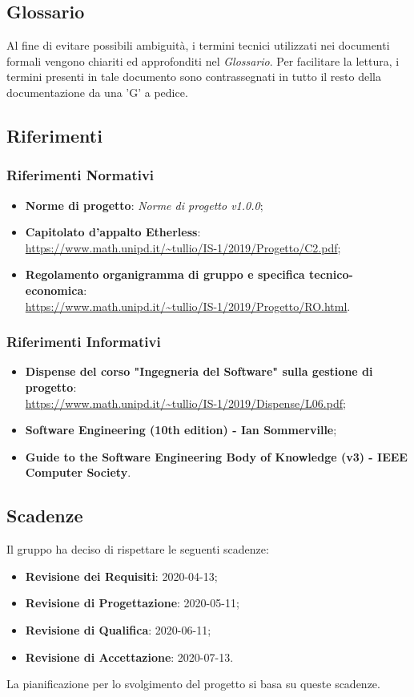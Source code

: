 \subsection{Glossario}
Al fine di evitare possibili ambiguità, i termini tecnici utilizzati nei documenti formali vengono chiariti ed approfonditi nel \textit{Glossario}. Per facilitare la lettura, i termini presenti in tale documento sono contrassegnati in tutto il resto della documentazione da una 'G' a pedice.
\subsection{Riferimenti}
\subsubsection{Riferimenti Normativi}
\begin{itemize}
	\item \textbf{Norme di progetto}: \textit{Norme di progetto v1.0.0};
	\item \textbf{Capitolato d'appalto Etherless}:\\\url{https://www.math.unipd.it/~tullio/IS-1/2019/Progetto/C2.pdf};
	\item \textbf{Regolamento organigramma di gruppo e specifica tecnico-economica}:\\\url{https://www.math.unipd.it/~tullio/IS-1/2019/Progetto/RO.html}.
\end{itemize}
\subsubsection{Riferimenti Informativi}
\begin{itemize}
	\item \textbf{Dispense del corso "Ingegneria del Software" sulla gestione di progetto}:\\\url{https://www.math.unipd.it/~tullio/IS-1/2019/Dispense/L06.pdf};
	\item \textbf{Software Engineering (10th edition) - Ian Sommerville};
	\item \textbf{Guide to the Software Engineering Body of Knowledge (v3) - IEEE Computer Society}.
\end{itemize}
\subsection{Scadenze}
Il gruppo \Gruppo{} ha deciso di rispettare le seguenti scadenze:
\begin{itemize}
	\item \textbf{Revisione dei Requisiti}: 2020-04-13;
	\item \textbf{Revisione di Progettazione}: 2020-05-11;
	\item \textbf{Revisione di Qualifica}: 2020-06-11;
	\item \textbf{Revisione di Accettazione}: 2020-07-13.
\end{itemize}
La pianificazione per lo svolgimento del progetto si basa su queste scadenze.
